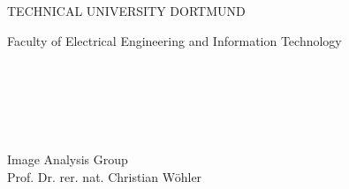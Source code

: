 \renewcommand{\textfraction}{0.0001}
\renewcommand{\topfraction}{0.9999}
\renewcommand{\bottomfraction}{0.9999}
\setcounter{topnumber}{10}
\setcounter{page}{0}
\thispagestyle{empty}


\begin{titlepage}

\begin{center}

\textsc{ \Large TECHNICAL UNIVERSITY DORTMUND}\\
\rule[0cm]{0cm}{0.8cm}
{\large Faculty of Electrical Engineering and Information Technology}\\

\rule[0cm]{0cm}{4.75cm}
\SADANummer\\ 

\vspace{1em}


\hspace{-0.0cm}\textbf{\large\SADATitel}\\
\rm
\normalsize

\vspace{1em}

\SADAStudent\\

\rule[0cm]{0cm}{4.75cm}

\textsf{Image Analysis Group\\ Prof. Dr. rer. nat. Christian W{\"o}hler}

\end{center}
\end{titlepage}
